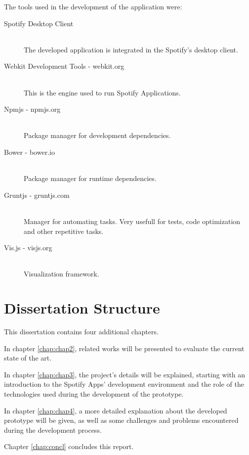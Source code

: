 The tools used in the development of the application were:

\begin{description}
  \item[Spotify Desktop Client] \hfill \\
    The developed application is integrated in the Spotify's desktop client.
  \item[Webkit Development Tools - webkit.org] \hfill \\
    This is the engine used to run Spotify Applications.
  \item[Npmjs - npmjs.org] \hfill \\
    Package manager for development dependencies.
  \item[Bower - bower.io] \hfill \\
    Package manager for runtime dependencies.
  \item[Gruntjs - gruntjs.com] \hfill \\
    Manager for automating tasks. Very usefull for tests, code optimization and other repetitive tasks.
  \item[Vis.js - visjs.org] \hfill \\
    Visualization framework.
\end{description}


\section{Dissertation Structure} \label{sec:struct}

This dissertation contains four additional chapters.

In chapter \ref{chap:chap2}, related works will be presented to evaluate the current state of the art.

In chapter \ref{chap:chap3}, the project's details will be explained, starting with an introduction to the Spotify Apps' development environment and the role of the technologies used during the development of the prototype.

In chapter \ref{chap:chap4}, a more detailed explanation about the developed prototype will be given, as well as some challenges and problems encountered during the development process.

Chapter \ref{chap:concl} concludes this report.
